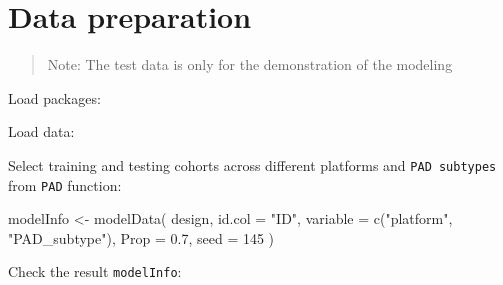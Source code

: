 \documentclass[
  12pt,
]{book}
\newenvironment{Shaded}{\begin{snugshade}}{\end{snugshade}}
\newcommand{\AttributeTok}[1]{\textcolor[rgb]{0.77,0.63,0.00}{#1}}
\newcommand{\DecValTok}[1]{\textcolor[rgb]{0.00,0.00,0.81}{#1}}
\newcommand{\FloatTok}[1]{\textcolor[rgb]{0.00,0.00,0.81}{#1}}
\newcommand{\FunctionTok}[1]{\textcolor[rgb]{0.00,0.00,0.00}{#1}}
\newcommand{\NormalTok}[1]{#1}
\newcommand{\OtherTok}[1]{\textcolor[rgb]{0.56,0.35,0.01}{#1}}
\newcommand{\SpecialCharTok}[1]{\textcolor[rgb]{0.00,0.00,0.00}{#1}}
\newcommand{\StringTok}[1]{\textcolor[rgb]{0.31,0.60,0.02}{#1}}
\begin{document}
\hypertarget{data-preparation}{%
\section{Data preparation}\label{data-preparation}}

\begin{quote}
Note: The test data is only for the demonstration of the modeling
\end{quote}

Load packages:

Load data:

\begin{Shaded}
\end{Shaded}

Select training and testing cohorts across different platforms and \texttt{PAD\ subtypes} from \texttt{PAD} function:

\begin{Shaded}
\begin{Highlighting}[]
\NormalTok{modelInfo }\OtherTok{\textless{}{-}} \FunctionTok{modelData}\NormalTok{(}
\NormalTok{    design,}
    \AttributeTok{id.col =} \StringTok{"ID"}\NormalTok{,}
    \AttributeTok{variable =} \FunctionTok{c}\NormalTok{(}\StringTok{"platform"}\NormalTok{, }\StringTok{"PAD\_subtype"}\NormalTok{),}
    \AttributeTok{Prop =} \FloatTok{0.7}\NormalTok{,}
    \AttributeTok{seed =} \DecValTok{145}
\NormalTok{  )}
\end{Highlighting}
\end{Shaded}

Check the result \texttt{modelInfo}:
\end{document}
